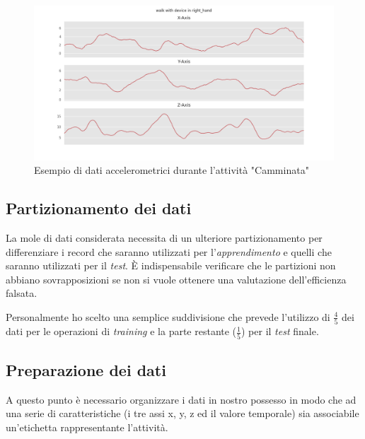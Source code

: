 \begin{figure}[H]
    \centering
    \includegraphics[scale = 0.45]{assets/images/classifications/accelerometer/right_hand/walk-right-hand-acc.png}
    \caption{Esempio di dati accelerometrici durante l'attività "Camminata"}
\end{figure}


\newpage
\subsection{Partizionamento dei dati}
La mole di dati considerata necessita di un ulteriore partizionamento per differenziare i record che saranno utilizzati per 
l'\textit{apprendimento} e quelli che saranno utilizzati per il \textit{test}.
È indispensabile verificare che le partizioni non abbiano sovrapposizioni se non si vuole ottenere una valutazione dell'efficienza falsata.

\vspace{5mm} %

Personalmente ho scelto una semplice suddivisione che prevede l'utilizzo di $\frac{4}{5}$ dei dati per le operazioni di \textit{training} e 
la parte restante ($\frac{1}{5}$) per il \textit{test} finale.


\subsection{Preparazione dei dati}
\label{section:learning-data-preparation}
A questo punto è necessario organizzare i dati in nostro possesso in modo che 
ad una serie di caratteristiche (i tre assi x, y, z ed il valore temporale) sia associabile un'etichetta 
rappresentante l'attività. 

